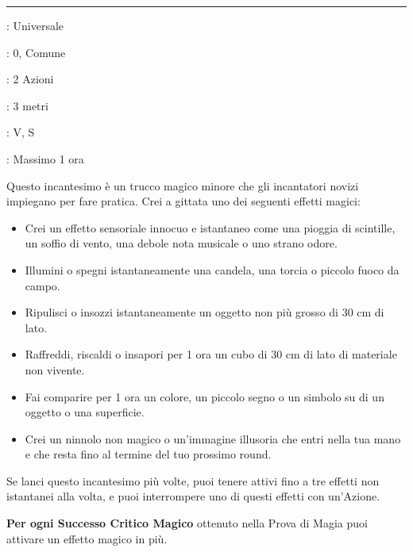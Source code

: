 \begin{multicols}{2}
\smallskip\noindent\rule{\linewidth}{2pt} \hypertarget{Prestidigitazione}{}\smallskip{}
\noindent
\begin{description}[noitemsep, topsep=0pt, parsep=0pt, partopsep=0pt, leftmargin=0cm, labelwidth=2.8cm]
	\item[\textbf{Lista di Magia}]: Universale
	\item[\textbf{Livello}]: 0, Comune
	\item[\textbf{T. di Lancio}]: 2 Azioni
	\item[\textbf{Gittata}]: 3 metri
	\item[\textbf{Componenti}]: V, S
	\item[\textbf{Durata}]: Massimo 1 ora
\end{description}

Questo incantesimo è un trucco magico minore che gli incantatori novizi impiegano per fare pratica. Crei a gittata uno dei seguenti effetti magici:

\begin{itemize}[leftmargin=*] \setlength{\itemsep}{0pt}
	\item Crei un effetto sensoriale innocuo e istantaneo come una pioggia di scintille, un soffio di vento, una debole nota musicale o uno strano odore.
	\item Illumini o spegni istantaneamente una candela, una torcia o piccolo fuoco da campo.
	\item Ripulisci o insozzi istantaneamente un oggetto non più grosso di 30 cm di lato.
	\item Raffreddi, riscaldi o insapori per 1 ora un cubo di 30 cm di lato di materiale non vivente.
	\item Fai comparire per 1 ora un colore, un piccolo segno o un simbolo su di un oggetto o una superficie.
	\item Crei un ninnolo non magico o un'immagine illusoria che entri nella tua mano e che resta fino al termine del tuo prossimo round.
\end{itemize}

Se lanci questo incantesimo più volte, puoi tenere attivi fino a tre effetti non istantanei alla volta, e puoi interrompere uno di questi effetti con un'Azione.

\textbf{Per ogni Successo Critico Magico} ottenuto nella Prova di Magia puoi attivare un effetto magico in più.


\end{multicols}

